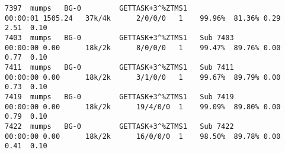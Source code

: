 \documentclass[]{article}
\begin{document}
\begin{landscape}
\begin{changemargin}{-0.25in}{-0.25in}
\begin{lstlisting}
7397  mumps   BG-0         GETTASK+3^%ZTMS1                       00:00:01 1505.24   37k/4k      2/0/0/0   1    99.96%  81.36% 0.29    2.51  0.10
7403  mumps   BG-0         GETTASK+3^%ZTMS1   Sub 7403            00:00:00 0.00      18k/2k      8/0/0/0   1    99.47%  89.76% 0.00    0.77  0.10
7411  mumps   BG-0         GETTASK+3^%ZTMS1   Sub 7411            00:00:00 0.00      18k/2k      3/1/0/0   1    99.67%  89.79% 0.00    0.73  0.10
7419  mumps   BG-0         GETTASK+3^%ZTMS1   Sub 7419            00:00:00 0.00      18k/2k      19/4/0/0  1    99.09%  89.80% 0.00    0.79  0.10
7422  mumps   BG-0         GETTASK+3^%ZTMS1   Sub 7422            00:00:00 0.00      18k/2k      16/0/0/0  1    98.50%  89.78% 0.00    0.41  0.10
\end{lstlisting}
\end{changemargin}
\end{landscape}
\end{document}

